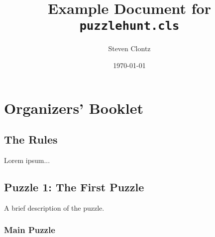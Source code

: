 \documentclass{puzzlehunt}
\title{Example Document for \texttt{puzzlehunt.cls}}
\author{Steven Clontz}
\date{\today}
\begin{document}
\frontmatter %

\puzzlehuntTitle %
\tableofcontents %


\mainmatter %

\part{Organizers' Booklet}

\chapter{The Rules}
Lorem ipsum...

\chapter{Puzzle 1: The First Puzzle}
A brief description of the puzzle.

\section{Main Puzzle}
\end{document}

